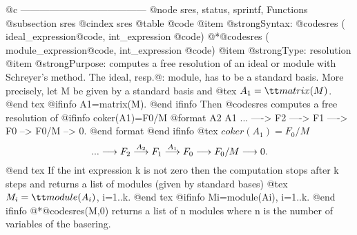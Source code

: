{{{{{{{@c ---------------------------------------
@node sres, status, sprintf, Functions
@subsection sres
@cindex sres
@table @code
@item @strong{Syntax:}
@code{sres (} ideal_expression@code{,} int_expression @code{)}
@*@code{sres (} module_expression@code{,} int_expression @code{)}
@item @strong{Type:}
resolution
@item @strong{Purpose:}
computes a free resolution of an ideal or module with Schreyer's
method. The ideal, resp.@: module, has to be a standard basis.
More precisely, let M be given by a standard basis and
@tex
$A_1={\tt matrix}(M)$.
@end tex
@ifinfo
A1=matrix(M).
@end ifinfo
Then @code{sres}
computes a free resolution of
@ifinfo
coker(A1)=F0/M
@format
                    A2       A1
      ... ----> F2 ----> F1 ----> F0 --> F0/M --> 0.
@end format
@end ifinfo
@tex
$coker(A_1)=F_0/M$
$$...\longrightarrow F_2 \buildrel{A_2}\over{\longrightarrow} F_1 \buildrel{A_1}\over{\longrightarrow} F_0\longrightarrow F_0/M\longrightarrow 0.$$
@end tex
If the int expression k is not zero then the computation stops after k steps
and returns a list of modules (given by standard bases)
@tex
$M_i={\tt module}(A_i)$, i=1..k.
@end tex
@ifinfo
Mi=module(Ai), i=1..k.
@end ifinfo
@*@code{sres(M,0)}
returns a list of n modules where n is the number of variables of the basering.

}}}}}}}
